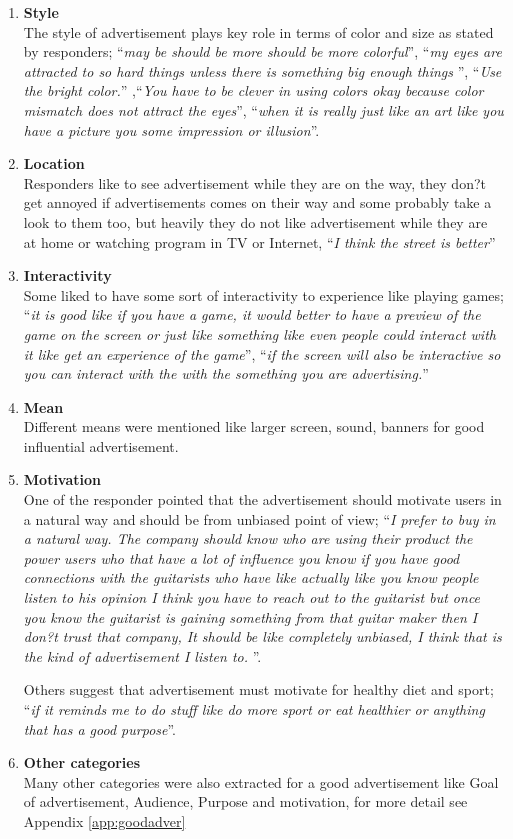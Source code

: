 \begin{enumerate}
\item \textbf{Style} \\	
The style of advertisement plays key role in terms of color and size as stated by responders; ``\emph{may be should be more should be more colorful}'', ``\emph{my eyes are attracted to so hard things unless there is something big enough things }'', ``\emph{Use the bright color.}'' ,``\emph{You have to be clever in using colors okay because color mismatch does not attract the eyes}'', ``\emph{when it is really just like an art like you have a picture you some impression or illusion}''.

\item \textbf{Location} \\	
Responders like to see advertisement while they are on the way, they don?t get annoyed if advertisements comes on their way and some probably take a look to them too, but heavily they do not like advertisement while they are at home or watching program in TV or Internet, ``\emph{I think the street is better}''

\item \textbf{Interactivity} \\	
Some liked to have some sort of interactivity to experience like playing games; ``\emph{it is good like if you have a game, it would better to have a preview of the game on the screen or just like something like even people could interact with it like get an experience of the game}'', ``\emph{if the screen will also be interactive so you can interact with the with the something you are advertising.}''

\item \textbf{Mean} \\
Different means were mentioned like larger screen, sound, banners for good influential advertisement.

\item \textbf{Motivation} \\
One of the responder pointed that the advertisement should motivate users in a natural way and should be from unbiased point of view; ``\emph{I prefer to buy in a natural way. The company should know who are using their product the power users who that have a lot of influence you know if you have good connections with the guitarists who have like actually like you know people listen to his opinion I think you have to reach out to the guitarist but once you know the guitarist is gaining something from that guitar maker then I don?t trust that company, It should be like completely unbiased, I think that is the kind of advertisement I listen to. }''. 

Others suggest that advertisement must motivate for healthy diet and sport; ``\emph{if it reminds me to do stuff like do more sport or eat healthier or anything that has a good purpose}''.

\item \textbf{Other categories} \\
Many other categories were also extracted for a good advertisement like Goal of advertisement, Audience, Purpose and motivation, for more detail see Appendix \ref{app:goodadver} 
		
\end{enumerate}
